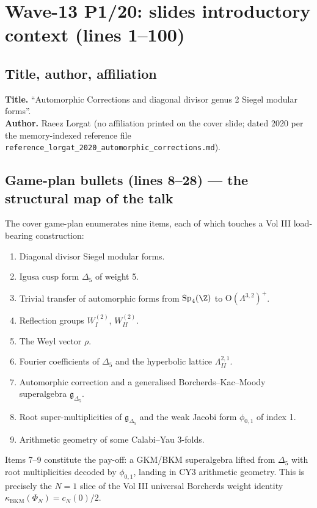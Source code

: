 
\providecommand{\kBKM}{\kappa_{\mathrm{BKM}}}
\providecommand{\kch}{\kappa_{\mathrm{ch}}}
\providecommand{\kcat}{\kappa_{\mathrm{cat}}}
\providecommand{\Sp}{\mathrm{Sp}}
\providecommand{\GL}{\mathrm{GL}}
\providecommand{\SM}{\mathcal{SM}}

\section*{Wave-13 P1/20: slides introductory context (lines 1--100)}

\subsection*{Title, author, affiliation}

\textbf{Title.} ``Automorphic Corrections and diagonal divisor genus 2
Siegel modular forms''.\\
\textbf{Author.} Raeez Lorgat (no affiliation printed on the cover
slide; dated 2020 per the memory-indexed reference file
\texttt{reference\_lorgat\_2020\_automorphic\_corrections.md}).

\subsection*{Game-plan bullets (lines 8--28) --- the structural map of
the talk}

The cover game-plan enumerates nine items, each of which touches a Vol
III load-bearing construction:
\begin{enumerate}
\item Diagonal divisor Siegel modular forms.
\item Igusa cusp form $\Delta_5$ of weight 5.
\item Trivial transfer of automorphic forms from $\Sp_4(\Z)$ to
$\mathrm{O}(\Lambda^{3,2})^+$.
\item Reflection groups $W_I^{(2)}$, $W_{II}^{(2)}$.
\item The Weyl vector $\rho$.
\item Fourier coefficients of $\Delta_5$ and the hyperbolic lattice
$\Lambda_{II}^{2,1}$.
\item Automorphic correction and a generalised Borcherds--Kac--Moody
superalgebra $\mathfrak{g}_{\Delta_5}$.
\item Root super-multiplicities of $\mathfrak{g}_{\Delta_5}$ and the
weak Jacobi form $\phi_{0,1}$ of index 1.
\item Arithmetic geometry of some Calabi--Yau 3-folds.
\end{enumerate}
Items 7--9 constitute the pay-off: a GKM/BKM superalgebra lifted from
$\Delta_5$ with root multiplicities decoded by $\phi_{0,1}$, landing in
CY3 arithmetic geometry. This is precisely the $N=1$ slice of the Vol
III universal Borcherds weight identity $\kBKM(\Phi_N) = c_N(0)/2$.

